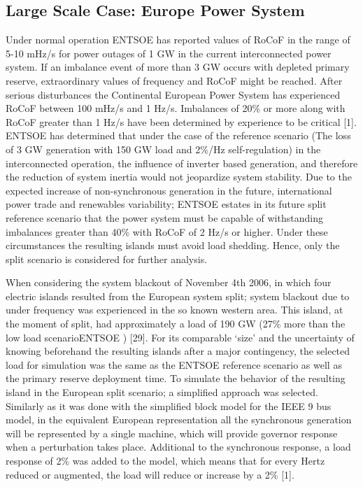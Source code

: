 \subsection{Large Scale Case: Europe Power System}

Under normal operation ENTSOE has reported values of RoCoF in the range of 5-10 mHz/s for power outages of 1 GW in the current interconnected power system. If an imbalance event of more than 3 GW occurs with depleted primary reserve, extraordinary values of frequency and RoCoF might be reached. After serious disturbances the Continental European Power System has experienced RoCoF between 100 mHz/s and 1 Hz/s. Imbalances of 20\% or more along with RoCoF greater than 1 Hz/s have been determined by experience to be critical [1].
ENTSOE has determined that under the case of the reference scenario (The loss of 3 GW generation with 150 GW load and 2\%/Hz self-regulation) in the interconnected operation, the influence of inverter based generation, and therefore the reduction of system inertia would not jeopardize system stability. Due to the expected increase of non-synchronous generation in the future, international power trade and renewables variability; ENTSOE estates in its future split reference scenario that the power system must be capable of withstanding imbalances greater than 40\% with RoCoF of 2 Hz/s or higher. Under these circumstances the resulting islands must avoid load shedding. Hence, only the split scenario is considered for further analysis.

When considering the system blackout of November 4th 2006, in which four electric islands resulted from the European system split; system blackout due to under frequency was experienced in the so known western area. This island, at the moment of split, had approximately a load of 190 GW (27\% more than the low load scenarioENTSOE ) [29]. For its comparable `size’ and the uncertainty of knowing beforehand the resulting islands after a major contingency, the selected load for simulation was the same as the ENTSOE reference scenario as well as the primary reserve deployment time. To simulate the behavior of the resulting island in the European split scenario; a simplified approach was selected. Similarly as it was done with the simplified block model for the IEEE 9 bus model, in the equivalent European representation all the synchronous generation will be represented by a single machine, which will provide governor response when a perturbation takes place. Additional to the synchronous response, a load response of 2\% was added to the model, which means that for every Hertz reduced or augmented, the load will reduce or increase by a 2\% [1]. \\
 
